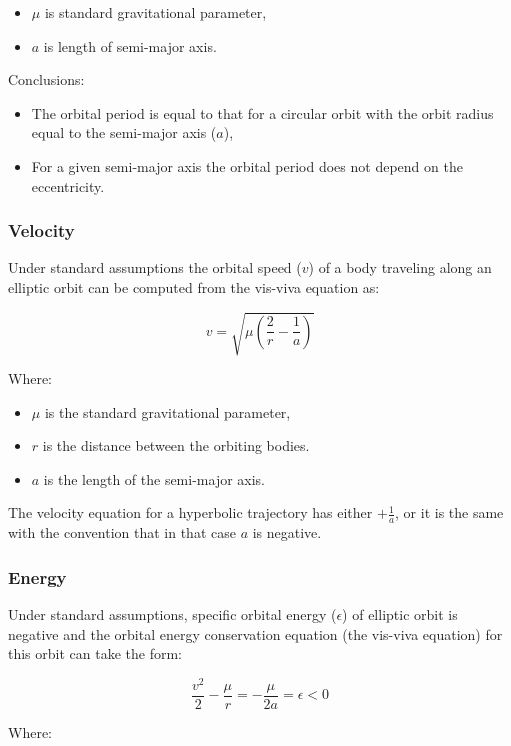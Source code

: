 \documentclass[12pt]{article}
\begin{document}
\begin{itemize}
  \item \(\mu\) is standard gravitational parameter,
  \item \(a\) is length of semi-major axis.
\end{itemize}

Conclusions:

\begin{itemize}
  \item The orbital period is equal to that for a circular orbit with the orbit
    radius equal to the semi-major axis (\(a\)),
  \item For a given semi-major axis the orbital period does not depend on the
    eccentricity.
\end{itemize}

\subsubsection{Velocity}

Under standard assumptions the orbital speed (\(v\)) of a body traveling along
an elliptic orbit can be computed from the vis-viva equation as:

\[v=\sqrt{\mu\left({\frac{2}{r}-\frac{1}{a}}\right)}\]

Where:

\begin{itemize}
  \item \(\mu\) is the standard gravitational parameter,
  \item \(r\) is the distance between the orbiting bodies.
  \item \(a\) is the length of the semi-major axis.
\end{itemize}

The velocity equation for a hyperbolic trajectory has either \(+\frac{1}{a}\),
or it is the same with the convention that in that case \(a\) is negative.

\subsubsection{Energy}

Under standard assumptions, specific orbital energy (\(\epsilon\)) of elliptic
orbit is negative and the orbital energy conservation equation (the vis-viva
equation) for this orbit can take the form:

\[\frac{v^2}{2}-\frac{\mu}{r}=-\frac{\mu}{2a}=\epsilon<0\]

Where:
\end{document}

